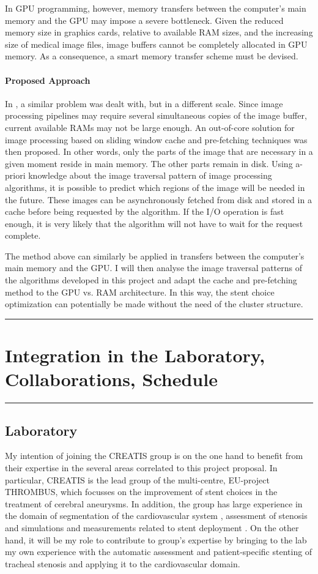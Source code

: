 \documentclass[a4paper]{article}
\newcommand{\approach}{\paragraph{Proposed Approach}}
\newcommand{\citep}{\cite}
\begin{document}
In GPU programming, however, memory transfers between the computer's main memory and the GPU may impose a severe bottleneck. Given the reduced memory size in graphics cards, relative to available RAM sizes, and the increasing size of medical image files, image buffers cannot be completely allocated in GPU memory. As a consequence, a smart memory transfer scheme must be devised. 

\approach
In \citep{Pinho:Cache1}, a similar problem was dealt with, but in a different scale. Since image processing pipelines may require several simultaneous copies of the image buffer, current available RAMs may not be large enough. An out-of-core solution for image processing based on sliding window cache and pre-fetching techniques was then proposed. In other words, only the parts of the image that are necessary in a given moment reside in main memory. The other parts remain in disk. Using a-priori knowledge about the image traversal pattern of image processing algorithms, it is possible to predict which regions of the image will be needed in the future. These images can be asynchronously fetched from disk and stored in a cache before being requested by the algorithm. If the I/O operation is fast enough, it is very likely that the algorithm will not have to wait for the request complete. 

The method above can similarly be applied in transfers between the computer's main memory and the GPU. I will then analyse the image traversal patterns of the algorithms developed in this project and adapt the cache and pre-fetching method to the GPU vs. RAM architecture. In this way, the stent choice optimization can potentially be made without the need of the cluster structure.

\medskip
\medskip
\hrule
\section{Integration in the Laboratory, Collaborations, Schedule}
\hrule

\medskip
\medskip

\subsection{Laboratory}

My intention of joining the CREATIS group is on the one hand to benefit from their expertise in the several areas correlated to this project proposal. In particular, CREATIS is the lead group of the multi-centre, EU-project THROMBUS, which focusses on the improvement of stent choices in the treatment of cerebral aneurysms. In addition, the group has large experience in the domain of segmentation of the cardiovascular system \citep{BARB-11c,Florez2,FLOR-07b,ORKI-08}, assessment of stenosis \citep{HERN-06b} and simulations and measurements related to stent deployment \citep{Florez,ATTI-08,ZAHN-11d,BOUS-09c,SULA-08a}. On the other hand, it will be my role to contribute to group's expertise by bringing to the lab my own experience with the automatic assessment and patient-specific stenting of tracheal stenosis and applying it to the cardiovascular domain.
\end{document}
